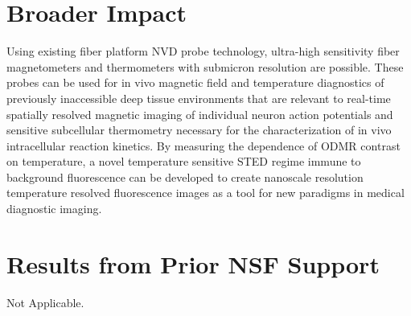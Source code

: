 \documentclass[11pt]{article}
\begin{document}
\section{Broader Impact}
Using existing fiber platform NVD probe technology, ultra-high sensitivity fiber 
magnetometers and thermometers with submicron resolution are possible.  These probes can be 
used for in vivo magnetic field and temperature diagnostics of previously inaccessible deep 
tissue environments that are relevant to real-time spatially resolved magnetic imaging of 
individual neuron action potentials and sensitive subcellular thermometry necessary for the 
characterization of in vivo intracellular reaction kinetics.  By measuring the dependence 
of ODMR contrast on temperature, a novel temperature sensitive STED regime immune to 
background fluorescence can be developed to create nanoscale resolution temperature 
resolved fluorescence images as a tool for new paradigms in medical diagnostic imaging.

\section{Results from Prior NSF Support}
Not Applicable.


\end{document}
